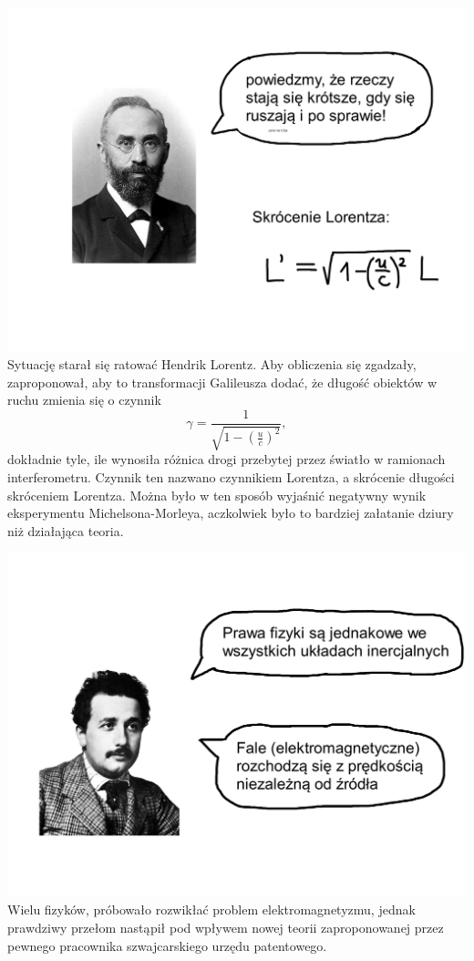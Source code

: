 \documentclass[10pt,twocolumn,fleqn,polish]{article}
\begin{document}
\noindent\includegraphics[width=1\linewidth]{pages/STA-page17}
Sytuację starał się ratować Hendrik Lorentz. Aby obliczenia się zgadzały, zaproponował,
aby to transformacji Galileusza dodać, że długość obiektów w ruchu zmienia się
o czynnik
\[\gamma = \frac{1}{\sqrt{1 - \left(\frac{u}{c}\right)^2}},\]
dokładnie tyle, ile wynosiła różnica drogi przebytej przez światło w ramionach
interferometru. Czynnik ten nazwano czynnikiem Lorentza, a skrócenie długości
skróceniem Lorentza.
Można było w ten sposób wyjaśnić negatywny wynik eksperymentu
Michelsona-Morleya, aczkolwiek było to bardziej załatanie dziury niż działająca
teoria.
\newpage

\noindent\includegraphics[width=1\linewidth]{pages/STA-page18}
Wielu fizyków, próbowało rozwikłać problem elektromagnetyzmu, jednak prawdziwy
przełom nastąpił pod wpływem nowej teorii zaproponowanej przez pewnego pracownika
szwajcarskiego urzędu patentowego.
\end{document}
